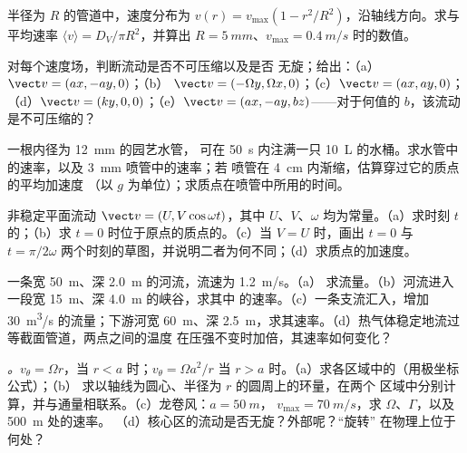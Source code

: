 \begin{exercise}[$\star$]\label{exo:b2:fluid-kinematics:3}
半径为 $R$ 的管道中，速度分布为 $v(r) = v_{\max}(1 -
r^2/R^2)$，沿轴线方向。求与平均速率 $\langle v\rangle
= D_V/\pi R^2$，并算出 $R = \qty{5}{mm}$、$v_{\max} = \qty{0.4}{m/s}$ 时的数值。
\end{exercise}

\begin{exercise}[$\star$]\label{exo:b2:fluid-kinematics:4}
对每个速度场，判断流动是否不可压缩以及是否
无旋；给出：（a）$\vect v = (ax, -ay, 0)$；（b）
$\vect v = (-\Omega y, \Omega x, 0)$；（c）$\vect v = (ax, ay, 0)$；（d）$\vect v =
(ky, 0, 0)$；（e）$\vect v = (ax, -ay, bz)$——对于何值的 $b$，该流动
是不可压缩的？
\end{exercise}

\begin{exercise}[$\star\star$]\label{exo:b2:fluid-kinematics:5}
一根内径为 \qty{12}{mm} 的园艺水管，
可在 \qty{50}{s} 内注满一只 \qty{10}{L} 的水桶。求水管中的速率，以及 \qty{3}{mm} 喷管中的速率；若
喷管在 \qty{4}{cm} 内渐缩，估算穿过它的质点的平均加速度
（以 $g$ 为单位）；求质点在喷管中所用的时间。
\end{exercise}

\begin{exercise}[$\star\star$]\label{exo:b2:fluid-kinematics:6}
非稳定平面流动 $\vect v = (U, V\cos\omega t)$，其中 $U$、$V$、$\omega$
均为常量。（a）求时刻 $t$ 的；（b）求
$t = 0$ 时位于原点的质点的。（c）当 $V = U$ 时，画出 $t = 0$ 与
$t = \pi/2\omega$ 两个时刻的草图，并说明二者为何不同；（d）求质点的加速度。
\end{exercise}

\begin{exercise}[$\star\star$]\label{exo:b2:fluid-kinematics:7}
一条宽 \qty{50}{m}、深 \qty{2.0}{m} 的河流，流速为 \qty{1.2}{m/s}。（a）
求流量。（b）河流进入一段宽 \qty{15}{m}、深 \qty{4.0}{m} 的峡谷，求其中
的速率。（c）一条支流汇入，增加 \qty{30}{m^3/s} 的流量；下游河宽
\qty{60}{m}、深 \qty{2.5}{m}，求其速率。（d）热气体稳定地流过
等截面管道，两点之间的温度
在压强不变时加倍，其速率如何变化？
\end{exercise}

\begin{exercise}[$\star\star$]\label{exo:b2:fluid-kinematics:8}
\emph{。}$v_\theta = \Omega r$，当 $r < a$ 时；$v_\theta = \Omega a^2/r$
当 $r > a$ 时。（a）求各区域中的（用极坐标公式）；（b）
求以轴线为圆心、半径为 $r$ 的圆周上的环量，在两个
区域中分别计算，并与通量相联系。（c）龙卷风：$a = \qty{50}{m}$，
$v_{\max} = \qty{70}{m/s}$，求 $\Omega$、$\Gamma$，以及 \qty{500}{m} 处的速率。
（d）核心区的流动是否无旋？外部呢？“旋转”
在物理上位于何处？
\end{exercise}

